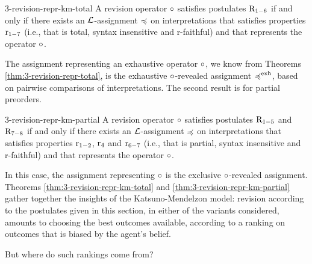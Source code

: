 \begin{thm}{\cite{KatsunoM92}}{3-revision-repr-km-total}
	A revision operator $\circ$ satisfies postulates $\mathrm{R}_{1-6}$ 
	if and only if
	there exists an $\mathcal{L}$-assignment $\preccurlyeq$ on interpretations
	that satisfies properties $\mathrm{r}_{1-7}$
	(i.e., that is total, syntax insensitive and r-faithful) 
	and that represents the operator $\circ$.
\end{thm}

The assignment representing an exhaustive operator $\circ$, we know from 
Theorems \ref{thm:3-revision-repr-total},
is the exhaustive $\circ$-revealed assignment $\preccurlyeq^{{\operatorname{exh}}}$,
based on pairwise comparisons of interpretations.
The second result is for partial preorders.

\begin{thm}{\cite{KatsunoM92}}{3-revision-repr-km-partial}
	A revision operator $\circ$ satisfies postulates $\mathrm{R}_{1-5}$ and $\mathrm{R}_{7-8}$ 
	if and only if
	there exists an $\mathcal{L}$-assignment $\preccurlyeq$ on interpretations
	that satisfies properties $\mathrm{r}_{1-2}$, $\mathrm{r}_{4}$ and $\mathrm{r}_{6-7}$
	(i.e., that is partial, syntax insensitive and r-faithful)
	and that represents the operator $\circ$.
\end{thm}

In this case, the assignment representing $\circ$ is the exclusive $\circ$-revealed assignment.
Theorems \ref{thm:3-revision-repr-km-total} and \ref{thm:3-revision-repr-km-partial} 
gather together the insights of the Katsuno-Mendelzon model:
revision according to the postulates given in this section, 
in either of the variants considered, 
amounts to choosing the best outcomes available, 
according to a ranking on outcomes
that is biased by the agent's belief.

But where do such rankings come from?

